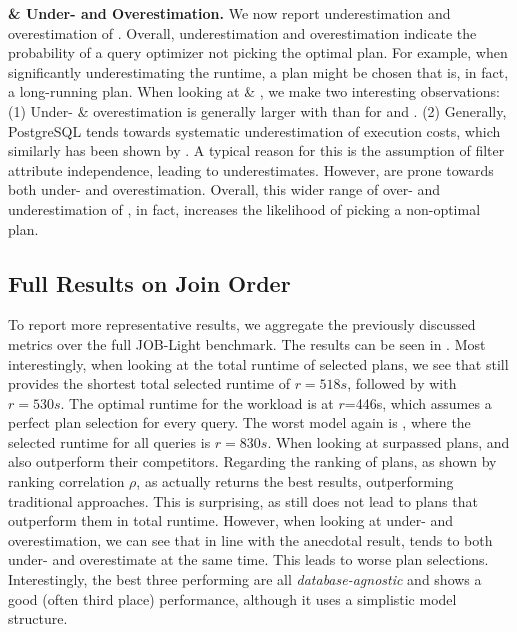 \textbf{ \&  Under- and Overestimation.}
We now report underestimation and overestimation of \lcms.
Overall, underestimation and overestimation indicate the probability of a query optimizer not picking the optimal plan.
For example, when significantly underestimating the runtime, a plan might be chosen that is, in fact, a long-running plan.
When looking at  \& , we make two interesting observations:
(1) Under- \& overestimation is generally larger with \lcms than for \postgresx and \postgresxvi.
(2) Generally, PostgreSQL tends towards systematic underestimation of execution costs, which similarly has been shown by \cite{leis_how_2015}.
A typical reason for this is the assumption of filter attribute independence, leading to underestimates. 
However, \lcms are prone towards both under- and overestimation.
Overall, this wider range of over- and underestimation of \lcms, in fact, increases the likelihood of picking a non-optimal plan.

\subsection{Full Results on Join Order}\label{sec:join_order_full}
To report more representative results, we aggregate the previously discussed metrics over the full JOB-Light benchmark. 
The results can be seen in .
Most interestingly, when looking at the total runtime of selected plans, we see that \postgresx still provides the shortest total selected runtime of $r=518s$, followed by \zeroshot with $r=530s$.
The optimal runtime for the workload is at $r$=446s, which assumes a perfect plan selection for every query. 
The worst model again is \queryformer, where the selected runtime for all queries is $r=830s$.
When looking at surpassed plans, \postgresx and \postgresxvi also outperform their \lcm competitors.
Regarding the ranking of plans, as shown by ranking correlation $\rho$, \zeroshot as \lcm actually returns the best results, outperforming traditional approaches.
This is surprising, as \zeroshot still does not lead to plans that outperform them in total runtime.
However, when looking at under- and overestimation, we can see that in line with the anecdotal result, \zeroshot tends to both under- and overestimate at the same time.
This leads to worse plan selections.
Interestingly, the best three performing \lcms are all \textit{database-agnostic} and \flatvector shows a good (often third place) performance, although it uses a simplistic model structure.

